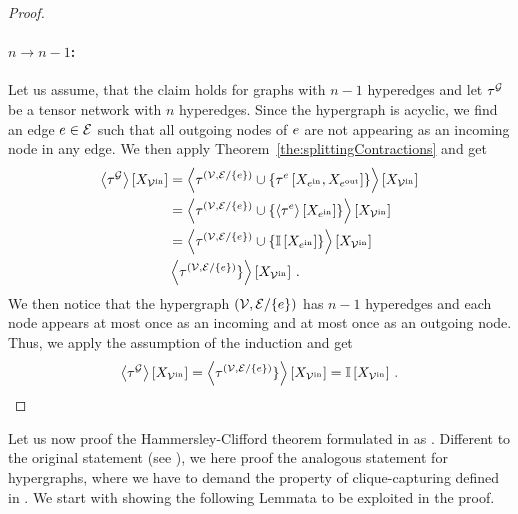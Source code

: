 \begin{proof}
    \paragraph{$n\rightarrow n-1$:} Let us assume, that the claim holds for graphs with $n-1$ hyperedges and let $\tau^{\mathcal{G}}$ be a tensor network with $n$ hyperedges.
    Since the hypergraph is acyclic, we find an edge $e\in\mathcal{E}$ such that all outgoing nodes of $e$ are not appearing as an incoming node in any edge.
    We then apply Theorem~\ref{the:splittingContractions} and get
    \begin{align*}
        \left\langle \tau^{\mathcal{G}}\right\rangle \left[ X_{\mathcal{V}^{\mathrm{in}}} \right]
        &= \left\langle 
            \tau^{(\mathcal{V},\mathcal{E}/\{e\})} \cup \{\tau^{e}\left[X_{e^{\mathrm{in}}},X_{e^{\mathrm{out}}}\right]\}
        \right\rangle \left[ X_{\mathcal{V}^{\mathrm{in}}} \right] \\
        & = \left\langle 
            \tau^{(\mathcal{V},\mathcal{E}/\{e\})} \cup \{\left\langle \tau^{e}\right\rangle \left[ X_{e^{\mathrm{in}}} \right] \}
        \right\rangle \left[ X_{\mathcal{V}^{\mathrm{in}}} \right] \\
        & = \left\langle 
            \tau^{(\mathcal{V},\mathcal{E}/\{e\})} \cup \{\mathbb{I}\left[X_{e^{\mathrm{in}}}\right] \}
        \right\rangle \left[ X_{\mathcal{V}^{\mathrm{in}}} \right] \\
        & \left\langle 
            \tau^{(\mathcal{V},\mathcal{E}/\{e\})} \}
        \right\rangle \left[ X_{\mathcal{V}^{\mathrm{in}}} \right] \, .
    \end{align*}
    We then notice that the hypergraph $(\mathcal{V},\mathcal{E}/\{e\})$ has $n-1$ hyperedges and each node appears at most once as an incoming and at most once as an outgoing node.
    Thus, we apply the assumption of the induction and get
    \begin{align*}
        \left\langle \tau^{\mathcal{G}}\right\rangle \left[ X_{\mathcal{V}^{\mathrm{in}}} \right] = \left\langle 
            \tau^{(\mathcal{V},\mathcal{E}/\{e\})} \}
        \right\rangle \left[ X_{\mathcal{V}^{\mathrm{in}}} \right] = \mathbb{I}\left[X_{\mathcal{V}^{\mathrm{in}}}\right] \, .
    \end{align*}
\end{proof}


\label{sec:proofHCTheorem}

Let us now proof the Hammersley-Clifford theorem formulated in  as .
Different to the original statement (see \cite{clifford_markov_1971}), we here proof the analogous statement for hypergraphs, where we have to demand the property of clique-capturing defined in .
We start with showing the following Lemmata to be exploited in the proof.

